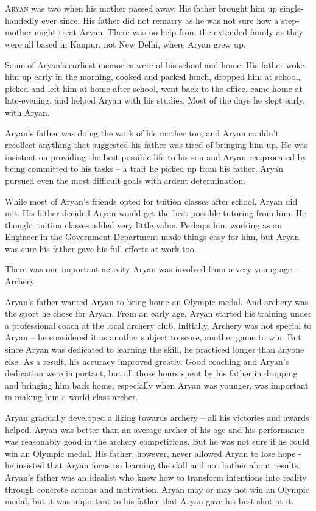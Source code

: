 \chapter{}

\lettrine{A}{ryan} was two when his mother passed away. His father brought him up
single-handedly ever since. His father did not remarry as he was not sure how a
step-mother might treat Aryan. There was no help from the extended family as
they were all based in Kanpur, not New Delhi, where Aryan grew up.

Some of Aryan's earliest memories were of his school and home. His father woke
him up early in the morning, cooked and packed lunch, dropped him at school,
picked and left him at home after school, went back to the office, came home at
late-evening, and helped Aryan with his studies. Most of the days he slept
early, with Aryan.

Aryan's father was doing the work of his mother too, and Aryan couldn't
recollect anything that suggested his father was tired of bringing him up. He
was insistent on providing the best possible life to his son and Aryan
reciprocated by being committed to his tasks – a trait he picked up from his
father. Aryan pursued even the most difficult goals with ardent determination.

While most of Aryan's friends opted for tuition classes after school, Aryan did
not. His father decided Aryan would get the best possible tutoring from him. He
thought tuition classes added very little value. Perhaps him working as an
Engineer in the Government Department made things easy for him, but Aryan was
sure his father gave his full efforts at work too.

There was one important activity Aryan was involved from a very young age –
Archery.

Aryan's father wanted Aryan to bring home an Olympic medal. And archery was the
sport he chose for Aryan. From an early age, Aryan started his training under a
professional coach at the local archery club. Initially, Archery was not special
to Aryan – he considered it as another subject to score, another game to win.
But since Aryan was dedicated to learning the skill, he practiced longer than
anyone else. As a result, his accuracy improved greatly. Good coaching and
Aryan's dedication were important, but all those hours spent by his father in
dropping and bringing him back home, especially when Aryan was younger, was
important in making him a world-class archer.

Aryan gradually developed a liking towards archery – all his victories and
awards helped. Aryan was better than an average archer of his age and his
performance was reasonably good in the archery competitions. But he was not sure
if he could win an Olympic medal. His father, however, never allowed Aryan to
lose hope - he insisted that Aryan focus on learning the skill and not bother
about results. Aryan's father was an idealist who knew how to transform
intentions into reality through concrete actions and motivation. Aryan may or may
not win an Olympic medal, but it was important to his father that Aryan gave his
best shot at it.

